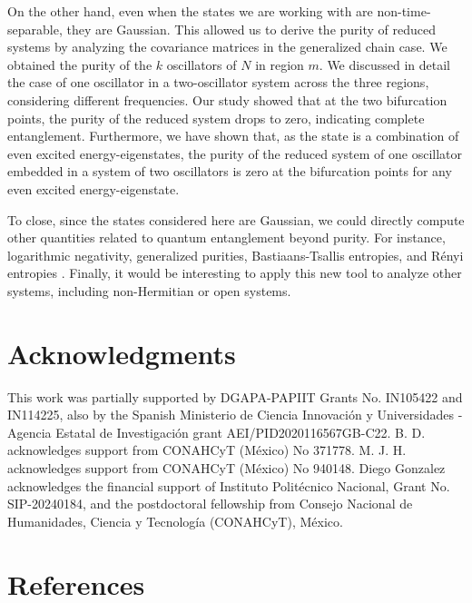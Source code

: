 \documentclass[12pt]{iopart}
\begin{document}
On the other hand, even when the states we are working with are non-time-separable, they are Gaussian. This allowed us to derive the purity of reduced systems by analyzing the covariance matrices in the generalized chain case. We obtained the purity of the $k$ oscillators of $N$ in region $m$. We discussed in detail the case of one oscillator in a two-oscillator system across the three regions, considering different frequencies. Our study showed that at the two bifurcation points, the purity of the reduced system drops to zero, indicating complete entanglement. Furthermore, we have shown that, as the state is a combination of even excited energy-eigenstates, the purity of the reduced system of one oscillator embedded in a system of two oscillators is zero at the bifurcation points for any even excited energy-eigenstate.

To close, since the states considered here are Gaussian, we could directly compute other quantities related to quantum entanglement beyond purity. For instance, logarithmic negativity, generalized purities, Bastiaans-Tsallis entropies, and Rényi entropies \cite{renyi1970} \cite{serafini2017, Bastiaans84, Tsallis88, adesso2014, Diaz2023}. Finally, it would be interesting to apply this new tool to analyze other systems, including non-Hermitian or open systems.

\section*{Acknowledgments}
This work was partially supported by DGAPA-PAPIIT Grants \break No. IN105422 and IN114225, also by the Spanish Ministerio de Ciencia Innovación y Universidades - Agencia Estatal de Investigación grant AEI/PID2020116567GB-C22. B. D. acknowledges support from CONAHCyT (M\'exico)  No 371778. M. J. H. acknowledges support from CONAHCyT (M\'exico)  No 940148. Diego Gonzalez acknowledges the financial support of Instituto Polit\'ecnico Nacional, Grant No. SIP-20240184, and the postdoctoral fellowship from Consejo Nacional de Humanidades, Ciencia y Tecnología (CONAHCyT), México.
\appendix






\section*{References}


\end{document}
